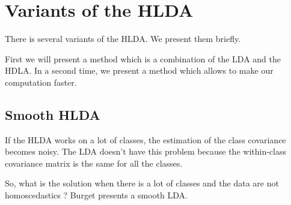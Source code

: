 
\section{Variants of the HLDA}
\label{sec:variants}

There is several variants of the HLDA. We present them briefly.

First we will present a method which is a combination of the LDA and
the HDLA. In a second time, we present a method which allows to make our
computation faster.

\subsection{Smooth HLDA}
\label{sec:smooth-hlda}

If the HLDA works on a lot of classes, the estimation of the class
covariance becomes noisy. The LDA doesn't have this problem because
the within-class covariance matrix is the same for all the classes.

So, what is the solution when there is a lot of classes and the data
are not homoscedastics ? Burget\cite{burget.2004} presents a smooth LDA.



